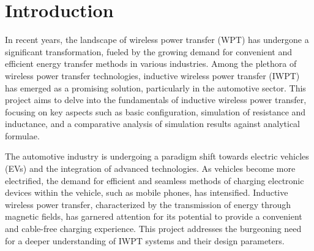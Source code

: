 \documentclass[11pt,a4paper,twoside,openany]{report}
\newcommand\declarationpage{}
\newcommand\acknowledgementspage{}
\newcommand\abstractpage{}
\begin{document}
    
    \begin{titlepage}
        
    \end{titlepage}

    \newpage\blankpage








    \tableofcontents

    \chapter*{Introduction}
    \label{chap:introduction}
    
    In recent years, the landscape of wireless power transfer (WPT) has undergone a significant transformation, fueled by the growing demand for convenient and efficient energy transfer methods in various industries. Among the plethora of wireless power transfer technologies, inductive wireless power transfer (IWPT) has emerged as a promising solution, particularly in the automotive sector. This project aims to delve into the fundamentals of inductive wireless power transfer, focusing on key aspects such as basic configuration, simulation of resistance and inductance, and a comparative analysis of simulation results against analytical formulae.

    The automotive industry is undergoing a paradigm shift towards electric vehicles (EVs) and the integration of advanced technologies. As vehicles become more electrified, the demand for efficient and seamless methods of charging electronic devices within the vehicle, such as mobile phones, has intensified. Inductive wireless power transfer, characterized by the transmission of energy through magnetic fields, has garnered attention for its potential to provide a convenient and cable-free charging experience. This project addresses the burgeoning need for a deeper understanding of IWPT systems and their design parameters.
\end{document}

